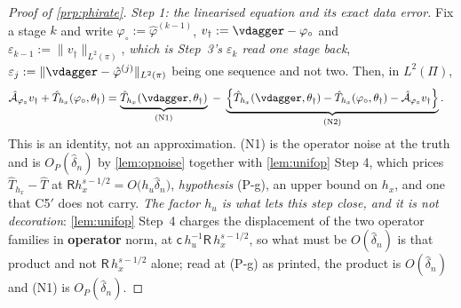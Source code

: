 \begin{proof}[Proof of \cref{prp:phirate}]
\emph{Step 1: the linearised equation and its exact data error.} Fix a stage $k$ and write
$\varphi_\circ:=\hat\varphi^{(k-1)}$, $v_\dagger:=\vdagger-\varphi_\circ$ and
$\varepsilon_{k-1}:=\|v_\dagger\|_{L^{2}(\pi)}$, \emph{which is Step~3's $\varepsilon_k$ read one stage
back}, $\varepsilon_j:=\|\vdagger-\hat\varphi^{(j)}\|_{L^{2}(\pi)}$ being one sequence and not two.
Then, in $L^{2}(\Pi)$,
\begin{align}
\hat{\mathcal A}_{\varphi_\circ}v_\dagger+\hat T_{h_x}(\varphi_\circ,\theta_\dagger)
&=\underbrace{\hat T_{h_x}(\vdagger,\theta_\dagger)}_{\text{(N1)}}
\;-\;\underbrace{\Big\{\hat T_{h_x}(\vdagger,\theta_\dagger)-\hat T_{h_x}(\varphi_\circ,\theta_\dagger)-\hat{\mathcal A}_{\varphi_\circ}v_\dagger\Big\}}_{\text{(N2)}} .
\label{eq:stagedecomp}
\end{align}
This is an identity, not an approximation. (N1) is the operator noise at the truth and is
$O_P(\hat\delta_n)$ by \cref{lem:opnoise} together with \cref{lem:unifop} Step 4, which prices
$\hat T_{h_x}-\hat T$ at $\mathsf Rh_x^{s-1/2}=O\big(h_u\hat\delta_n\big)$, \emph{hypothesis} (P-g),
an upper bound on $h_x$, and one that C5$'$ does not carry. \emph{The factor $h_u$ is what lets this
step close, and it is not decoration}: \cref{lem:unifop} Step~4 charges the displacement of the two
operator families in \textbf{operator} norm, at $\mathsf c\,h_u^{-1}\mathsf R\,h_x^{s-1/2}$, so what
must be $O(\hat\delta_n)$ is that product and not $\mathsf R\,h_x^{s-1/2}$ alone; read at (P-g) as
printed, the product is $O(\hat\delta_n)$ and (N1) is $O_P(\hat\delta_n)$.

\end{proof}

